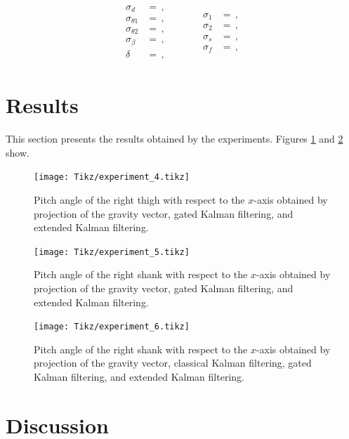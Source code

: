 \begin{equation}
\begin{matrix}
	\begin{split}
	  \sigma_d &= \,, \\
	  \sigma_{\theta 1} &= \,, \\
	  \sigma_{\theta 2} &= \,, \\
	  \sigma_{\beta} &= \,, \\
	  \delta &= \,,
\end{split} \qquad \quad
    \begin{split}
	  \sigma_1 &= \,, \\
	  \sigma_2 &= \,, \\
	  \sigma_s &= \,, \\
	  \sigma_f &= \,,  
\end{split}
\end{matrix}
\end{equation}

\section{Results}

This section presents the results obtained by the experiments. Figures \ref{fig:experiment_4} and \ref{fig:experiment_5} show.

\begin{figure}
	\centering
	\setlength\figureheight{7cm} 
	\setlength\figurewidth{\textwidth}
	\texttt{[image: Tikz/experiment\_4.tikz]}
	\caption{Pitch angle of the right thigh with respect to the $x$-axis obtained by projection of the gravity vector, gated Kalman filtering, and extended Kalman filtering.}
	\label{fig:experiment_4}
\end{figure}

\begin{figure}
	\centering
	\setlength\figureheight{7cm} 
	\setlength\figurewidth{\textwidth}
	\texttt{[image: Tikz/experiment\_5.tikz]}
	\caption{Pitch angle of the right shank with respect to the $x$-axis obtained by projection of the gravity vector, gated Kalman filtering, and extended Kalman filtering.}
	\label{fig:experiment_5}
\end{figure}

\begin{figure}
	\centering
	\setlength\figureheight{7cm} 
	\setlength\figurewidth{\textwidth}
	\texttt{[image: Tikz/experiment\_6.tikz]}
	\caption{Pitch angle of the right shank with respect to the $x$-axis obtained by projection of the gravity vector, classical Kalman filtering, gated Kalman filtering, and extended Kalman filtering.}
	\label{fig:experiment_6}
\end{figure}

\section{Discussion}

